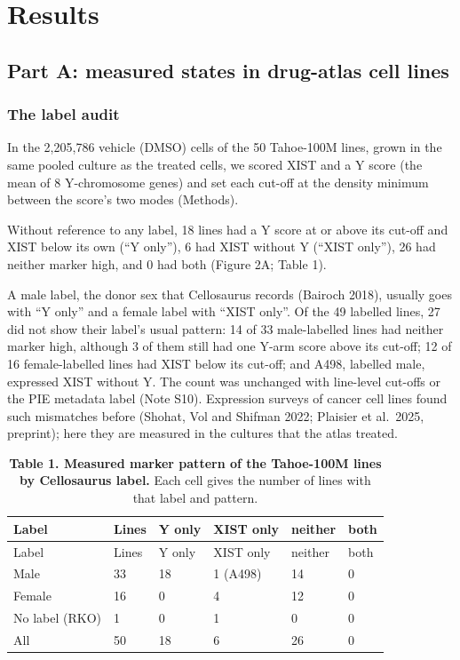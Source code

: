 \documentclass[
  11pt,
  letterpaper,
]{article}
\begin{document}
\section{Results}\label{results}

\subsection{Part A: measured states in drug-atlas cell
lines}\label{part-a-measured-states-in-drug-atlas-cell-lines}

\subsubsection{The label audit}\label{the-label-audit}

In the 2,205,786 vehicle (DMSO) cells of the 50 Tahoe-100M lines, grown
in the same pooled culture as the treated cells, we scored XIST and a Y
score (the mean of 8 Y-chromosome genes) and set each cut-off at the
density minimum between the score's two modes (Methods).

Without reference to any label, 18 lines had a Y score at or above its
cut-off and XIST below its own (``Y only''), 6 had XIST without Y
(``XIST only''), 26 had neither marker high, and 0 had both (Figure 2A;
Table 1).

A male label, the donor sex that Cellosaurus records (Bairoch 2018),
usually goes with ``Y only'' and a female label with ``XIST only''. Of
the 49 labelled lines, 27 did not show their label's usual pattern: 14
of 33 male-labelled lines had neither marker high, although 3 of them
still had one Y-arm score above its cut-off; 12 of 16 female-labelled
lines had XIST below its cut-off; and A498, labelled male, expressed
XIST without Y. The count was unchanged with line-level cut-offs or the
PIE metadata label (Note S10). Expression surveys of cancer cell lines
found such mismatches before (Shohat, Vol and Shifman 2022; Plaisier et
al.~2025, preprint); here they are measured in the cultures that the
atlas treated.

\begin{longtable}[]{@{}llllll@{}}
\caption{\textbf{Table 1. Measured marker pattern of the Tahoe-100M
lines by Cellosaurus label.} Each cell gives the number of lines with
that label and pattern.}\tabularnewline
\toprule\noalign{}
Label & Lines & Y only & XIST only & neither & both \\
\midrule\noalign{}
\endfirsthead
\toprule\noalign{}
Label & Lines & Y only & XIST only & neither & both \\
\midrule\noalign{}
\endhead
\bottomrule\noalign{}
\endlastfoot
Male & 33 & 18 & 1 (A498) & 14 & 0 \\
Female & 16 & 0 & 4 & 12 & 0 \\
No label (RKO) & 1 & 0 & 1 & 0 & 0 \\
All & 50 & 18 & 6 & 26 & 0 \\
\end{longtable}
\end{document}
